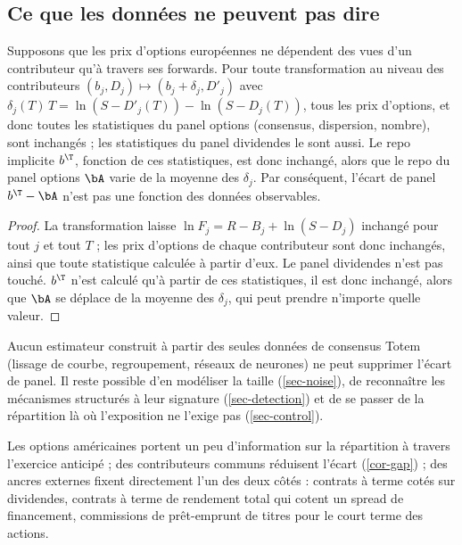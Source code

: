\subsection{Ce que les données ne peuvent pas dire}
\begin{theorem}\label{thm-nonid}
Supposons que les prix d'options européennes ne dépendent des vues d'un contributeur qu'à travers ses forwards. Pour
toute transformation au niveau des contributeurs $(b_j,D_j)\mapsto(b_j+\delta_j,D'_j)$ avec
$\delta_j(T)\,T=\ln(S-D'_j(T))-\ln(S-D_j(T))$, tous les prix d'options, et donc toutes les statistiques du panel options
(consensus, dispersion, nombre), sont inchangés ; les statistiques du panel dividendes le sont aussi. Le repo implicite
$b^\T$, fonction de ces statistiques, est donc inchangé, alors que le repo du panel options $\bA$ varie de la moyenne
des $\delta_j$. Par conséquent, l'écart de panel $b^\T-\bA$ n'est pas une fonction des données observables.
\end{theorem}
\begin{proof}
La transformation laisse $\ln F_j=R-B_j+\ln(S-D_j)$ inchangé pour tout $j$ et tout $T$ ; les prix d'options de chaque
contributeur sont donc inchangés, ainsi que toute statistique calculée à partir d'eux. Le panel dividendes n'est pas
touché. $b^\T$ n'est calculé qu'à partir de ces statistiques, il est donc inchangé, alors que $\bA$ se déplace de la
moyenne des $\delta_j$, qui peut prendre n'importe quelle valeur.
\end{proof}

\begin{corollary}
Aucun estimateur construit à partir des seules données de consensus Totem (lissage de courbe, regroupement, réseaux de
neurones) ne peut supprimer l'écart de panel. Il reste possible d'en modéliser la taille (\cref{sec-noise}), de
reconnaître les mécanismes structurés à leur signature (\cref{sec-detection}) et de se passer de la répartition là où
l'exposition ne l'exige pas (\cref{sec-control}).
\end{corollary}

\begin{remark}
Les options américaines portent un peu d'information sur la répartition à travers l'exercice anticipé ; des
contributeurs communs réduisent l'écart (\cref{cor-gap}) ; des ancres externes fixent directement l'un des deux
côtés : contrats à terme cotés sur dividendes, contrats à terme de rendement total qui cotent un spread de financement,
commissions de prêt-emprunt de titres pour le court terme des actions.
\end{remark}

